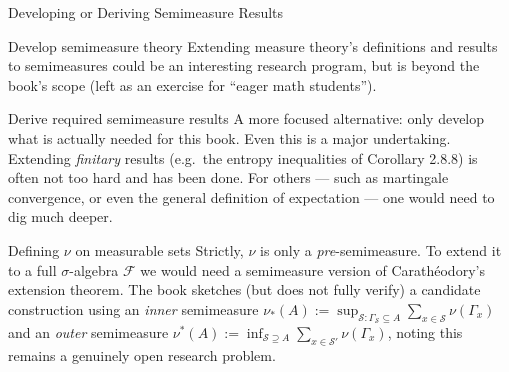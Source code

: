 \documentclass[aspectratio=169,10pt]{beamer}
\begin{document}
\begin{frame}{Developing or Deriving Semimeasure Results}
  \begin{block}{Develop semimeasure theory}
    Extending measure theory's definitions and results to semimeasures could
    be an interesting research program, but is beyond the book's scope
    (left as an exercise for ``eager math students'').
  \end{block}

  \begin{block}{Derive required semimeasure results}
    A more focused alternative: only develop what is actually needed for
    this book. Even this is a major undertaking. Extending \emph{finitary}
    results (e.g.\ the entropy inequalities of Corollary 2.8.8) is often not
    too hard and has been done. For others --- such as martingale
    convergence, or even the general definition of expectation --- one would
    need to dig much deeper.
  \end{block}

  \begin{block}{Defining $\nu$ on measurable sets}
    Strictly, $\nu$ is only a \emph{pre}-semimeasure. To extend it to a full
    $\sigma$-algebra $\mathcal{F}$ we would need a semimeasure version of
    Carathéodory's extension theorem. The book sketches (but does not fully
    verify) a candidate construction using an \emph{inner} semimeasure
    $\nu_*(A) := \sup_{\mathcal{S}:\Gamma_\mathcal{S}\subseteq A}
    \sum_{x\in\mathcal{S}} \nu(\Gamma_x)$ and an \emph{outer} semimeasure
    $\nu^*(A) := \inf_{\mathcal{S}\supseteq A} \sum_{x\in\mathcal{S}'}
    \nu(\Gamma_x)$, noting this remains a genuinely open research problem.
  \end{block}
\end{frame}
\end{document}
